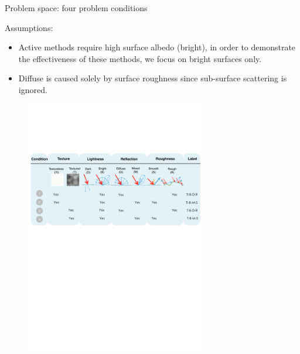 \documentclass[10pt]{beamer}
\begin{document}
\begin{frame}{Problem space: four problem conditions}

Assumptions:
\begin{itemize}
\item Active methods require high surface albedo (bright), in order to demonstrate the effectiveness of these methods, we focus on bright surfaces only.
\item Diffuse is caused solely by surface roughness since sub-surface scattering is ignored.
\end{itemize}

\begin{figure}[h]
\includegraphics[width=0.7\textwidth]{taxo/prob_cond}
\end{figure}

\end{frame}

\end{document}
